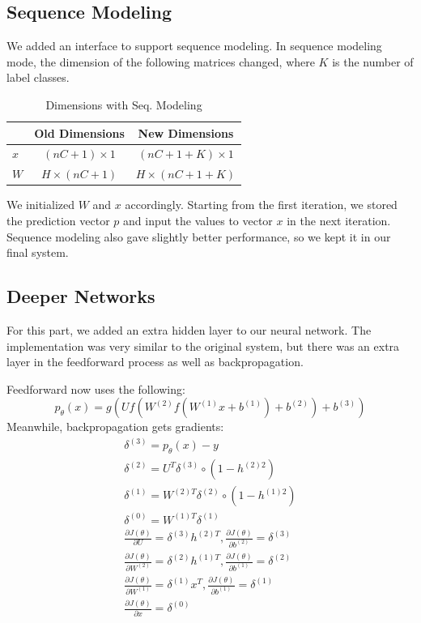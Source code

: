 \documentclass[12pt, twocolumn]{article}
\begin{document}
\subsection{Sequence Modeling}
We added an interface to support sequence modeling. In sequence modeling mode, the dimension of the following matrices changed, where $K$ is the number of label classes.
\begin{table}[H]
\centering
	\begin{tabular}{|l|c|c|}
		\hline
		 & Old Dimensions & New Dimensions \\\hline
		$x$ & ${(nC+1)}\times{1}$ & ${(nC+1+K)}\times{1}$ \\\hline
		$W$ & ${H}\times{(nC+1)}$ & ${H}\times{(nC+1+K)}$ \\\hline
	\end{tabular}
\caption{Dimensions with Seq. Modeling}
\label{tab:dim2}
\end{table}
We initialized $W$ and $x$ accordingly. Starting from the first iteration, we stored the prediction vector $p$ and input the values to vector $x$ in the next iteration. Sequence modeling also gave slightly better performance, so we kept it in our final system.
\subsection{Deeper Networks}
For this part, we added an extra hidden layer to our neural network. The implementation was very similar to the original system, but there was an extra layer in the feedforward process as well as backpropagation.

Feedforward now uses the following:
\begin{equation*}
p_\theta(x)=g(Uf(W^{(2)}f(W^{(1)}x + b^{(1)})+b^{(2)})+b^{(3)})
\end{equation*}
Meanwhile, backpropagation gets gradients:
\begin{gather*}
\delta^{(3)} = p_\theta(x) - y\\
\delta^{(2)} = U^T\delta^{(3)}\circ(1-h^{(2)2})\\
\delta^{(1)} = W^{(2)T}\delta^{(2)}\circ(1-h^{(1)2})\\
\delta^{(0)} = W^{(1)T}\delta^{(1)}\\
\frac{\partial J(\theta)}{\partial U} = \delta^{(3)}h^{(2)T}, \frac{\partial J(\theta)}{\partial b^{(2)}} = \delta^{(3)}\\
\frac{\partial J(\theta)}{\partial W^{(2)}} = \delta^{(2)}h^{(1)T}, \frac{\partial J(\theta)}{\partial b^{(1)}} = \delta^{(2)}\\
\frac{\partial J(\theta)}{\partial W^{(1)}} = \delta^{(1)}x^T, \frac{\partial J(\theta)}{\partial b^{(1)}} = \delta^{(1)}\\
\frac{\partial J(\theta)}{\partial x} = \delta^{(0)}\\
\end{gather*}
\vspace{-36pt}
\end{document}
